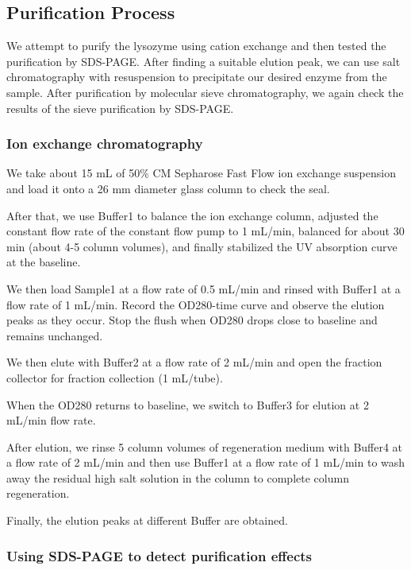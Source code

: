 \hypertarget{purification-process}{%
	\subsection{Purification Process}\label{purification-process}}

We attempt to purify the lysozyme using cation exchange and then
tested the purification by SDS-PAGE. After finding a suitable elution
peak, we can use salt chromatography with resuspension to precipitate
our desired enzyme from the sample. After purification by molecular
sieve chromatography, we again check the results of the sieve
purification by SDS-PAGE.

\subsubsection{Ion exchange chromatography}

We take about 15 mL of 50\% CM Sepharose Fast Flow ion exchange
suspension and load it onto a 26 mm diameter glass column to check the
seal.

After that, we use Buffer1 to balance the ion exchange column, adjusted
the constant flow rate of the constant flow pump to 1 mL/min, balanced
for about 30 min (about 4-5 column volumes), and finally stabilized the
UV absorption curve at the baseline.

We then load Sample1 at a flow rate of 0.5 mL/min and rinsed with
Buffer1 at a flow rate of 1 mL/min. Record the OD280-time curve and
observe the elution peaks as they occur. Stop the flush when OD280
drops close to baseline and remains unchanged.

We then elute with Buffer2 at a flow rate of 2 mL/min and open the
fraction collector for fraction collection (1 mL/tube).

When the OD280 returns to baseline, we switch to Buffer3 for elution at
2 mL/min flow rate.

After elution, we rinse 5 column volumes of regeneration medium with
Buffer4 at a flow rate of 2 mL/min and then use Buffer1 at a flow rate
of 1 mL/min to wash away the residual high salt solution in the column
to complete column regeneration.

Finally, the elution peaks at different Buffer are obtained.

\subsubsection{Using SDS-PAGE to detect purification effects}

